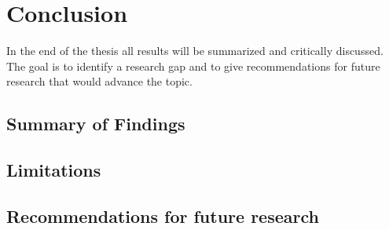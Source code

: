 \section{Conclusion}
In the end of the thesis all results will be summarized and critically discussed. The goal is to identify a research gap and to give recommendations for future research that would advance the topic.
 
 \subsection{Summary of Findings}
 
 \subsection{Limitations}
 
 \subsection{Recommendations for future research}